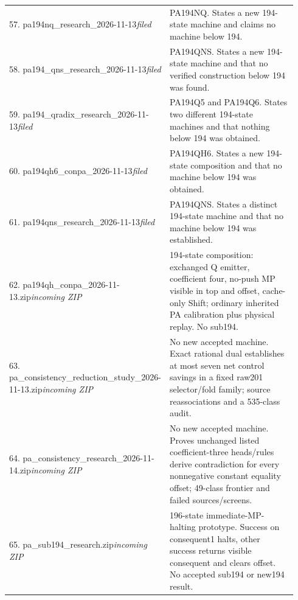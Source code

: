 \begin{longtable}{@{}p{0.43\linewidth}p{0.51\linewidth}@{}}
57. pa194nq\_\allowbreak{}research\_\allowbreak{}2026-11-13\newline\emph{filed} & PA194NQ. States a new 194-state machine and claims no machine below 194.\\[5pt]
58. pa194\_\allowbreak{}qns\_\allowbreak{}research\_\allowbreak{}2026-11-13\newline\emph{filed} & PA194QNS. States a new 194-state machine and that no verified construction below 194 was found.\\[5pt]
59. pa194\_\allowbreak{}qradix\_\allowbreak{}research\_\allowbreak{}2026-11-13\newline\emph{filed} & PA194Q5 and PA194Q6. States two different 194-state machines and that nothing below 194 was obtained.\\[5pt]
60. pa194qh6\_\allowbreak{}conpa\_\allowbreak{}2026-11-13\newline\emph{filed} & PA194QH6. States a new 194-state composition and that no machine below 194 was obtained.\\[5pt]
61. pa194qns\_\allowbreak{}research\_\allowbreak{}2026-11-13\newline\emph{filed} & PA194QNS. States a distinct 194-state machine and that no machine below 194 was established.\\[5pt]
62. pa194qh\_\allowbreak{}conpa\_\allowbreak{}2026-11-13.zip\newline\emph{incoming ZIP} & 194-state composition: exchanged Q emitter, coefficient four, no-push MP visible in top and offset, cache-only Shift; ordinary inherited PA calibration plus physical replay. No sub194.\\[5pt]
63. pa\_\allowbreak{}consistency\_\allowbreak{}reduction\_\allowbreak{}study\_\allowbreak{}2026-11-13.zip\newline\emph{incoming ZIP} & No new accepted machine. Exact rational dual establishes at most seven net control savings in a fixed raw201 selector/fold family; source reassociations and a 535-class audit.\\[5pt]
64. pa\_\allowbreak{}consistency\_\allowbreak{}research\_\allowbreak{}2026-11-14.zip\newline\emph{incoming ZIP} & No new accepted machine. Proves unchanged listed coefficient-three heads/rules derive contradiction for every nonnegative constant equality offset; 49-class frontier and failed sources/screens.\\[5pt]
65. pa\_\allowbreak{}sub194\_\allowbreak{}research.zip\newline\emph{incoming ZIP} & 196-state immediate-MP-halting prototype. Success on consequent1 halts, other success returns visible consequent and clears offset. No accepted sub194 or new194 result.\\[5pt]

\end{longtable}
